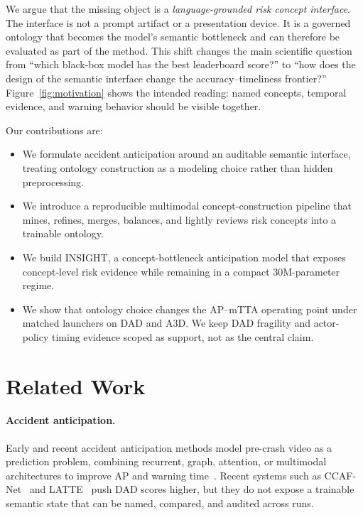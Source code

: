\documentclass[11pt]{article}
\newcommand{\method}{\textsc{INSIGHT}}
\begin{document}
We argue that the missing object is a \emph{language-grounded risk concept
interface}. The interface is not a prompt artifact or a presentation device. It
is a governed ontology that becomes the model's semantic bottleneck and can
therefore be evaluated as part of the method. This shift changes the main
scientific question from ``which black-box model has the best leaderboard
score?'' to ``how does the design of the semantic interface change the
accuracy--timeliness frontier?'' Figure~\ref{fig:motivation} shows the intended
reading: named concepts, temporal evidence, and warning behavior should be
visible together.

Our contributions are:
\begin{itemize}
  \item We formulate accident anticipation around an auditable semantic
  interface, treating ontology construction as a modeling choice rather than
  hidden preprocessing.
  \item We introduce a reproducible multimodal concept-construction pipeline
  that mines, refines, merges, balances, and lightly reviews risk concepts into
  a trainable ontology.
  \item We build \method{}, a concept-bottleneck anticipation model that exposes
  concept-level risk evidence while remaining in a compact 30M-parameter regime.
  \item We show that ontology choice changes the AP--mTTA operating point under
  matched launchers on DAD and A3D. We keep DAD fragility and actor-policy
  timing evidence scoped as support, not as the central claim.
\end{itemize}

\section{Related Work}

\paragraph{Accident anticipation.}
Early and recent accident anticipation methods model pre-crash video as a
prediction problem, combining recurrent, graph, attention, or multimodal
architectures to improve AP and warning time~\citep{ref4,ref17,ref32,liao2024crash}.
Recent systems such as CCAF-Net~\citep{liu2025ccaf} and
LATTE~\citep{ZHANG2025103173} push DAD scores higher, but they do not expose a
trainable semantic state that can be named, compared, and audited across runs.
\end{document}
